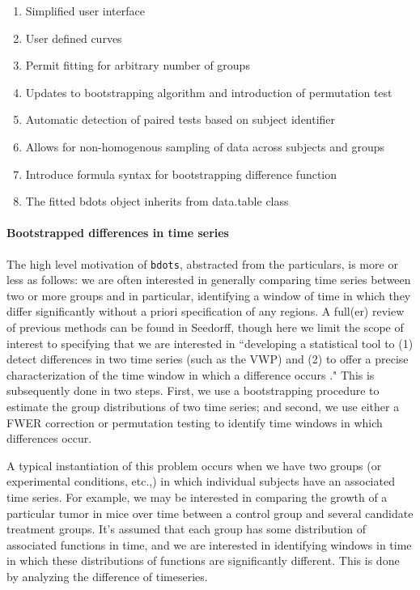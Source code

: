 \documentclass{article}
\newcommand{\xt}{\texttt}%
\begin{document}
\begin{singlespace}
\begin{enumerate}
\item Simplified user interface
\item User defined curves
\item Permit fitting for arbitrary number of groups
\item Updates to bootstrapping algorithm and introduction of permutation test
\item Automatic detection of paired tests based on subject identifier
\item Allows for non-homogenous sampling of data across subjects and groups
\item Introduce formula syntax for bootstrapping difference function
\item The fitted bdots object inherits from data.table class
\end{enumerate}
\end{singlespace}

\paragraph{Bootstrapped differences in time series}

The high level motivation of \xt{bdots}, abstracted from the particulars, is more or less as follows: we are often interested in generally comparing time series between two or more groups and in particular, identifying a window of time in which they differ significantly without a priori specification of any regions. A full(er) review of previous methods can be found in Seedorff, though here we limit the scope of interest to specifying that we are interested in ``developing a statistical tool to (1) detect differences in two time series (such as the VWP) and (2) to offer a precise characterization of the time window in which a difference occurs \cite{seedorff2018bdots}." This is subsequently done in two steps. First, we use a bootstrapping procedure to estimate the group distributions of two time series; and second, we use either a FWER correction or permutation testing to identify time windows in which differences occur.

A typical instantiation of this problem occurs when we have two groups (or experimental conditions, etc.,) in which individual subjects have an associated time series. For example, we may be interested in comparing the growth of a particular tumor in mice over time between a control group and several candidate treatment groups. It's assumed that each group has some distribution of associated functions in time, and we are interested in identifying windows in time in which these distributions of functions are significantly different. This is done by analyzing the difference of timeseries.
\end{document}
